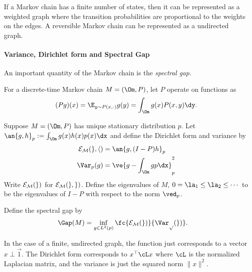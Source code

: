 If a Markov chain has a finite number of states, then it can be represented as a weighted graph where the transition probabilities are proportional to the weights on the edges. A reversible Markov chain can be represented as a undirected graph. 

\paragraph{Variance, Dirichlet form and Spectral Gap}
An important quantity of the Markov chain is the {\em spectral gap}.

\begin{df}
For a discrete-time Markov chain $M=(\Om, P)$, let $P$ operate on functions as
\begin{align}
(Pg)(x) = \E_{y\sim P(x,\cdot)} g(y) = \int_{\Om} g(x)P(x,y)\dy.
\end{align}

Suppose $M=(\Om, P)$ has unique stationary distribution $p$.
Let
$\an{g,h}_p :=\int_{\Om} g(x)h(x)p(x)\dx$ and define the Dirichlet form and variance by
\begin{align}
\cal E_M(g,h) &= \an{g, (I-P)h}_p \\
\Var_p(g) &= \ve{g-\int_{\Om} gp\dx}_p^2
\end{align}
Write $\cal E_M(g)$ for $\cal E_M(g,g)$. 
Define the eigenvalues of $M$, $0=\la_1\le \la_2\le \cdots$ to be the eigenvalues of $I-P$ with respect to the norm $\ved_{p}$. 

Define the spectral gap by
\begin{align}
\Gap(M) &= \inf_{g\in L^2(p)} \fc{\cal E_M(g)}{\Var_p(g)}.
\end{align}
\end{df}

In the case of a finite, undirected graph, the function just corresponds to a vector $x\perp \vec{1}$. The Dirichlet form corresponds to $x^\top \cL x$ where $\cL$ is the normalized Laplacian matrix, and the variance is just the squared norm $\|x\|^2$.

